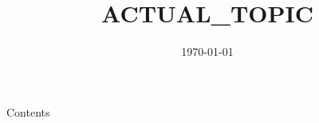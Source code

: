 


\newcommand{\topic}{
	ACTUAL\_TOPIC
}

\title{\topic}
\supertitle{\course}
\date{\today}



\maketitle

\begin{frame}{Contents}
	\tableofcontents
\end{frame}




